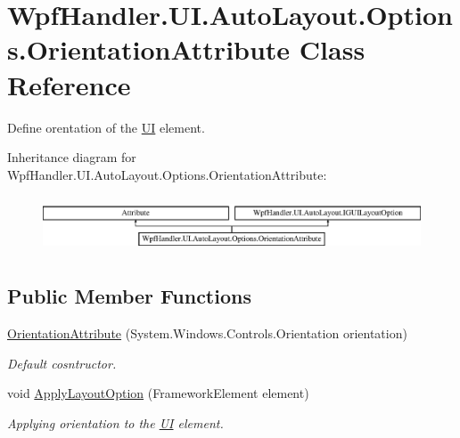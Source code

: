 \hypertarget{class_wpf_handler_1_1_u_i_1_1_auto_layout_1_1_options_1_1_orientation_attribute}{}\section{Wpf\+Handler.\+U\+I.\+Auto\+Layout.\+Options.\+Orientation\+Attribute Class Reference}
\label{class_wpf_handler_1_1_u_i_1_1_auto_layout_1_1_options_1_1_orientation_attribute}


Define orentation of the \mbox{\hyperlink{namespace_wpf_handler_1_1_u_i}{UI}} element.  


Inheritance diagram for Wpf\+Handler.\+U\+I.\+Auto\+Layout.\+Options.\+Orientation\+Attribute\+:\begin{figure}[H]
\begin{center}
\leavevmode
\includegraphics[height=1.696970cm]{d4/dae/class_wpf_handler_1_1_u_i_1_1_auto_layout_1_1_options_1_1_orientation_attribute}
\end{center}
\end{figure}
\subsection*{Public Member Functions}
\begin{DoxyCompactItemize}
\item 
\mbox{\hyperlink{class_wpf_handler_1_1_u_i_1_1_auto_layout_1_1_options_1_1_orientation_attribute_a1a2b97e91de843f677c37aac422b3667}{Orientation\+Attribute}} (System.\+Windows.\+Controls.\+Orientation orientation)
\begin{DoxyCompactList}\small\item\em Default cosntructor. \end{DoxyCompactList}\item 
void \mbox{\hyperlink{class_wpf_handler_1_1_u_i_1_1_auto_layout_1_1_options_1_1_orientation_attribute_affc825395d69d510dfc17e37d330dfc8}{Apply\+Layout\+Option}} (Framework\+Element element)
\begin{DoxyCompactList}\small\item\em Applying orientation to the \mbox{\hyperlink{namespace_wpf_handler_1_1_u_i}{UI}} element. \end{DoxyCompactList}\end{DoxyCompactItemize}
